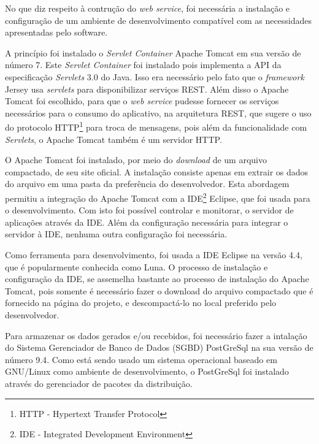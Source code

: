 	
	\par No que diz respeito à contrução do \textit{web service}, foi necessária a
instalação e configuração de um ambiente de desenvolvimento compatível com as
necessidades apresentadas pelo software.

	\par A princípio foi instalado o \textit{Servlet Container} Apache Tomcat em
sua versão de número {7}. Este \textit{Servlet Container} foi instalado pois
implementa a API da especificação \textit{Servlets} {3.0} do Java. Isso era
necessário pelo fato que o \textit{framework} Jersey usa \textit{servlets} para
disponibilizar serviços REST. Além disso o Apache Tomcat foi escolhido, para
que o \textit{web service} pudesse fornecer os serviços necessários para o
consumo do aplicativo, na arquitetura REST, que sugere o uso do protocolo
HTTP\footnote{HTTP - Hypertext Transfer Protocol} para troca de mensagens, pois
além da funcionalidade com \textit{Servlets}, o Apache Tomcat também é um
servidor HTTP.
	
	\par O Apache Tomcat foi instalado, por meio do \textit{download} de um
arquivo compactado, de seu site oficial. A instalação consiste apenas
em extrair os dados do arquivo em uma pasta da preferência do desenvolvedor.
Esta abordagem permitiu a integração do Apache Tomcat com a
IDE\footnote{IDE - Integrated Development Environment}
Eclipse, que foi usada para o desenvolvimento. Com isto foi possível controlar
e monitorar, o servidor de aplicações através da IDE. Além da configuração
necessária para integrar o servidor à IDE, nenhuma outra configuração foi
necessária.

	\par Como ferramenta para desenvolvimento, foi usada a IDE Eclipse na versão
{4.4}, que é popularmente conhecida como Luna. O processo de instalação e
configuração da IDE, se assemelha bastante ao processo de instalação do Apache
Tomcat, pois somente é necessário fazer o download do arquivo compactado que é
fornecido na página do projeto, e descompactá-lo no local preferido pelo
desenvolvedor.

	\par Para armazenar os dados gerados e/ou recebidos, foi necessário fazer a
intalação do Sistema Gerenciador de Banco de Dados (SGBD) PostGreSql na sua
versão de número {9.4}. Como está sendo usado um sistema operacional baseado em
GNU/Linux como ambiente de desenvolvimento, o PostGreSql foi instalado através
do gerenciador de pacotes da distribuição.
 
